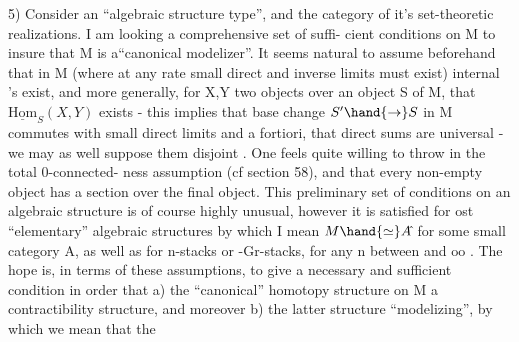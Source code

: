 5)   Consider an ``algebraic structure type'',  and the category  of  it's
set-theoretic realizations.  I am looking  a comprehensive set of suffi-%
cient conditions on M to insure that M is a``canonical modelizer''.   It seems
natural to assume beforehand that in M  (where at any rate small direct and
inverse limits must exist) internal \hand{\uline{\textcolor{black}{Hom}}}'s exist,  and more generally,
for  X,Y two objects over an object S of M,  that $\underline{\mathrm{Hom}}_S(X,Y)$  exists  -
this implies that base change $S'\hand{\to} S$ in M commutes with small direct limits
and a fortiori,  that direct sums are universal  -  we may as well suppose
them disjoint .  One feels quite willing  to throw in the total 0-connected-%
ness assumption  (cf section 58),  and that every non-empty object has a
section over the final object.    This preliminary set of conditions on an
algebraic structure is of course highly unusual,  however it is satisfied
for ost ``elementary'' algebraic structures\deleted{,} \hand{(}by which I mean $M\hand{\simeq}A\hat{}$ for some
small category A\hand{)},  as well as for  n-stacks or \hand{$\infty$}-Gr-stacks,  for any n
between  and $\mathrm{oo}$ .  The hope  is,  in terms of these assumptions,  to
give a necessary and sufficient condition in order that  a)  the ``canonical''
homotopy structure  on M   a contractibility structure,  and moreover
b)  the latter structure  ``modelizing'',  by which we mean that the

